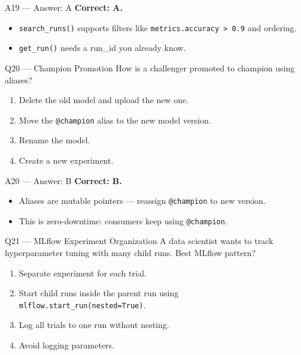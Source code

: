 \documentclass[aspectratio=169,10pt]{beamer}
\begin{document}
	\begin{frame}{A19 — Answer: A}
		\textbf{Correct: A.}
		\begin{itemize}
			\item \texttt{search\_runs()} supports filters like \texttt{metrics.accuracy > 0.9} and ordering.
			\item \texttt{get\_run()} needs a run\_id you already know.
		\end{itemize}
	\end{frame}
	
	\begin{frame}{Q20 — Champion Promotion}
		How is a challenger promoted to champion using aliases?
		\begin{enumerate}[label=\Alph*.]
			\item Delete the old model and upload the new one.
			\item Move the \texttt{@champion} alias to the new model version.
			\item Rename the model.
			\item Create a new experiment.
		\end{enumerate}
	\end{frame}
	
	\begin{frame}{A20 — Answer: B}
		\textbf{Correct: B.}
		\begin{itemize}
			\item Aliases are mutable pointers — reassign \texttt{@champion} to new version.
			\item This is zero-downtime: consumers keep using \texttt{@champion}.
		\end{itemize}
	\end{frame}
	
	\begin{frame}{Q21 — MLflow Experiment Organization}
		A data scientist wants to track hyperparameter tuning with many child runs. Best MLflow pattern?
		\begin{enumerate}[label=\Alph*.]
			\item Separate experiment for each trial.
			\item Start child runs inside the parent run using \texttt{mlflow.start\_run(nested=True)}.
			\item Log all trials to one run without nesting.
			\item Avoid logging parameters.
		\end{enumerate}
	\end{frame}
	
\end{document}
